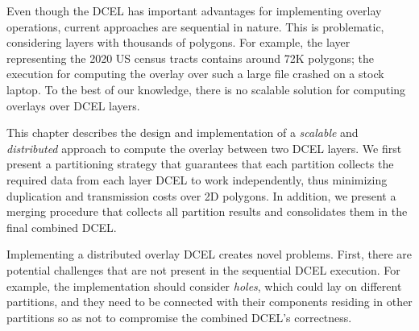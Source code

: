 Even though the DCEL has important advantages for implementing overlay operations, current approaches are sequential in nature. This is problematic, considering layers with thousands of polygons. For example, the layer representing the 2020 US census tracts contains around 72K polygons; the execution for computing the overlay over such a large file crashed on a stock laptop. To the best of our knowledge, there is no scalable solution for computing overlays over DCEL layers.


This chapter describes the design and implementation of a \textit{scalable} and \textit{distributed} approach to compute the overlay between two DCEL layers. We first present a partitioning strategy that guarantees that each partition collects the required data from each layer DCEL to work independently, thus minimizing duplication and transmission costs over 2D polygons. In addition, we present a merging procedure that collects all partition results and consolidates them in the final combined DCEL.


Implementing a distributed overlay DCEL creates novel problems. First, there are potential challenges that are not present in the sequential DCEL execution. For example, the implementation should consider \textit{holes}, which could lay on different partitions, and they need to be connected with their components residing in other partitions so as not to compromise the combined DCEL's correctness.

